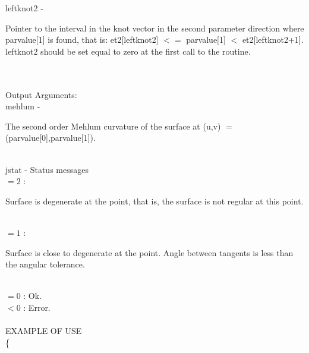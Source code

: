         \>\>    {\fov leftknot2}\> - \>  \begin{minipg2}
                     Pointer to the interval in the knot vector in the
                     second parameter direction where parvalue[1] is found,
                     that is:
                          et2[leftknot2] $<=$ parvalue[1] $<$ et2[leftknot2+1].
                     leftknot2 should be set equal to zero at the first call
                     to the routine.
                               \end{minipg2}\\[0.8ex]
\\
	\>Output Arguments:\\
        \>\>    {\fov mehlum}\> - \>  \begin{minipg2}
                     The second order Mehlum curvature
                     of the surface at (u,v) $=$
                     (parvalue[0],parvalue[1]).
                               \end{minipg2}\\[0.8ex]
        \>\>    {\fov jstat}     \> - \> Status messages\\
                \>\>\>\> $= 2$ : 
                       \> \begin{minipg5}  
                               Surface is degenerate at the point, that is,
                               the surface is not regular at this point.
                               \end{minipg5}\\[0.8ex]
                \>\>\>\>  $= 1$ :
                       \> \begin{minipg5}  
                               Surface is close to degenerate at the point.
                               Angle between tangents is less than the angular
                               tolerance.
                               \end{minipg5}\\[0.8ex]
                \>\>\>\> $= 0$ : \> Ok.\\
                \>\>\>\> $< 0$ : \> Error.\\
\\
EXAMPLE OF USE\\
		\>      \{ \\

